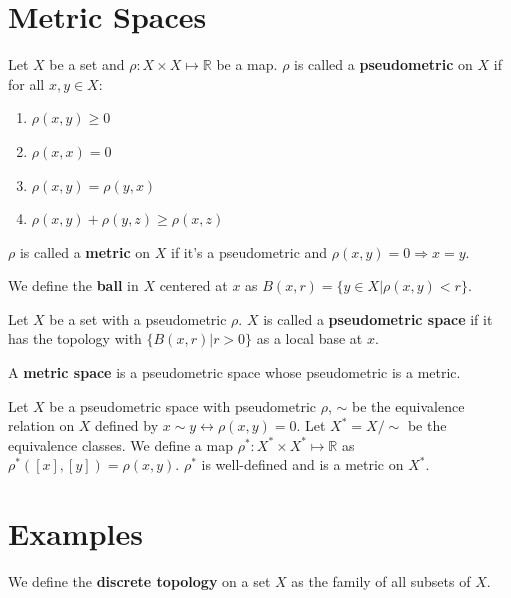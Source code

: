 \documentclass[12pt]{book}
\begin{document}
\section{Metric Spaces}
\begin{definition}
	Let $X$ be a set and $\rho:X\times X\mapsto\mathbb R$ be a map. $\rho$ is called a {\bf pseudometric} on $X$ if for all $x,y\in X$:
	\begin{enumerate}
		\item $\rho(x,y)\geq 0$
		\item $\rho(x,x)= 0$
		\item $\rho(x,y)=\rho(y,x)$
		\item $\rho(x,y)+\rho(y,z)\geq\rho(x,z)$
	\end{enumerate}
	$\rho$ is called a {\bf metric} on $X$ if it's a pseudometric and $\rho(x,y)=0\Rightarrow x=y$.
\end{definition}
\begin{definition}
	We define the {\bf ball} in $X$ centered at $x$ as $B(x,r)=\{y\in  X|\rho(x,y)<r\}$.
\end{definition}

\begin{definition}
	Let $X$ be a set with a pseudometric $\rho$. $X$ is called a {\bf pseudometric space} if it has the topology with $\{B(x,r)| r>0\}$ as a local base at $x$.
\end{definition}

\begin{definition}
	A {\bf metric space} is a pseudometric space whose pseudometric is a metric.
\end{definition}

\begin{lemma}
	Let $X$ be a pseudometric space with pseudometric $\rho$, $\sim$ be the equivalence relation on $X$ defined by $x\sim y\leftrightarrow\rho(x,y)=0$. Let $X^*=X/\sim$ be the equivalence classes. We define a map $\rho^*:X^*\times X^*\mapsto\mathbb R$ as $\rho^*([x],[y])=\rho(x,y)$. $\rho^*$ is well-defined and is a metric on $X^*$.
	\label{lem:metric_equi}
\end{lemma}

\section{Examples}

\begin{example}
	We define the {\bf discrete topology} on a set $X$ as the family of all subsets of $X$.
\end{example}
\end{document}

